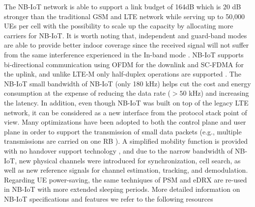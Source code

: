\documentclass[]{IEEEtran}
\begin{document}
The NB-IoT network is able to support a link budget of 164dB which is 20 dB stronger than the traditional GSM and LTE network\cite{hwang_survey_2019} while serving up to 50,000 UEs per cell with the possibility to scale up the capacity by allocating more carriers for NB-IoT\cite{raza2017low}. It is worth noting that, independent and guard-band modes are able to provide better indoor coverage since the received signal will not suffer from the same interference experienced in the In-band mode \cite{poursafar2017long}.
NB-IoT supports bi-directional communication using OFDM for the downlink and SC-FDMA for the uplink, and unlike LTE-M only half-duplex operations are supported \cite{ding_iot_2020}. The NB-IoT small bandwidth of NB-IoT (only 180 kHz) helps cut the cost and energy consumption at the expense of reducing the data rate ($> 50$ kHz\cite{rico2016overview}) and increasing the latency. In addition, even though NB-IoT was built on top of the legacy LTE network, it can be considered as a new interface from the protocol stack point of view\cite{mekki2019comparative}. Many optimizations have been adopted to both the control plane and user plane in order to support the transmission of small data packets \cite{sharma2019toward} (e.g., multiple transmissions are carried on one RB \cite{accurso_exploring_2021}). A simplified mobility function is provided with no handover support technology \cite{foubert2020long}, and due to the narrow bandwidth of NB-IoT, new physical channels were introduced for synchronization, cell search, as well as new reference signals for channel estimation, tracking, and demodulation\cite{rico2016overview}. Regarding UE power-saving, the same techniques of PSM and eDRX are re-used in NB-IoT with more extended sleeping periods\cite{vaezi_cellular_2022_2}.  More detailed information on NB-IoT specifications and features we refer to the following resources \cite{wang2017primer,chen2017narrow} 
\end{document}
